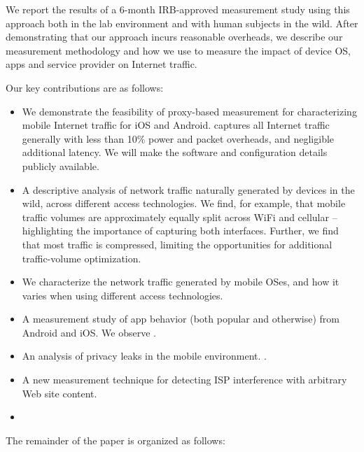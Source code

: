 We report the results of a 6-month IRB-approved measurement study using this approach both in the lab 
environment and with human subjects in the wild. After demonstrating that our approach incurs reasonable 
overheads, we describe our measurement methodology and how we use \platname to measure the 
impact of device OS, apps and service provider on Internet traffic.

Our key contributions are as follows:
\begin{itemize}
\item We demonstrate the feasibility of proxy-based measurement for characterizing mobile Internet traffic for iOS and Android. 
\platname captures all Internet traffic generally with less than 10\% power and packet overheads, and negligible additional 
latency. We will make the \platname software and configuration details publicly available.  
\item A descriptive analysis of network traffic naturally generated by devices in the wild, across different access 
technologies. We find, for example, that mobile traffic volumes are approximately equally split across WiFi and cellular -- 
highlighting the importance of capturing both interfaces. Further, we find that most traffic is compressed, limiting the 
opportunities for additional traffic-volume optimization.
\item We characterize the network traffic generated by mobile OSes, and how it varies when using different access technologies.
\item A measurement study of app behavior (both popular and otherwise) from Android and iOS. We observe . 
\item An analysis of privacy leaks in the mobile environment. .
\item A new measurement technique for detecting ISP interference with arbitrary Web site content.
\item {}
\end{itemize}

The remainder of the paper is organized as follows:






